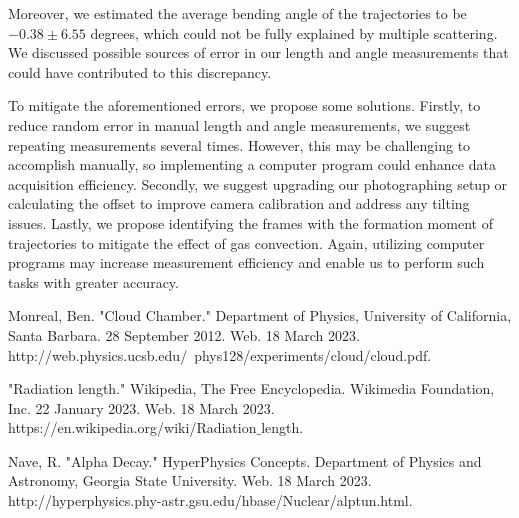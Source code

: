 \documentclass[letterpaper,12pt]{article}
\begin{document}
Moreover, we estimated the average bending angle of the trajectories to be $-0.38\pm 6.55$ degrees, which could not be fully explained by multiple scattering. We discussed possible sources of error in our length and angle measurements that could have contributed to this discrepancy.

To mitigate the aforementioned errors, we propose some solutions. Firstly, to reduce random error in manual length and angle measurements, we suggest repeating measurements several times. However, this may be challenging to accomplish manually, so implementing a computer program could enhance data acquisition efficiency. Secondly, we suggest upgrading our photographing setup or calculating the offset to improve camera calibration and address any tilting issues. Lastly, we propose identifying the frames with the formation moment of trajectories to mitigate the effect of gas convection. Again, utilizing computer programs may increase measurement efficiency and enable us to perform such tasks with greater accuracy.




\appendix
\begin{thebibliography}{5} %
 Monreal, Ben. "Cloud Chamber." Department of Physics, University of California, Santa Barbara. 28 September 2012. Web. 18 March 2023. http://web.physics.ucsb.edu/~phys128/experiments/cloud/cloud.pdf.

 "Radiation length." Wikipedia, The Free Encyclopedia. Wikimedia Foundation, Inc. 22 January 2023. Web. 18 March 2023. https://en.wikipedia.org/wiki/Radiation$\_$length.

 Nave, R. "Alpha Decay." HyperPhysics Concepts. Department of Physics and Astronomy, Georgia State University. Web. 18 March 2023. http://hyperphysics.phy-astr.gsu.edu/hbase/Nuclear/alptun.html.

\end{thebibliography}
\end{document}
